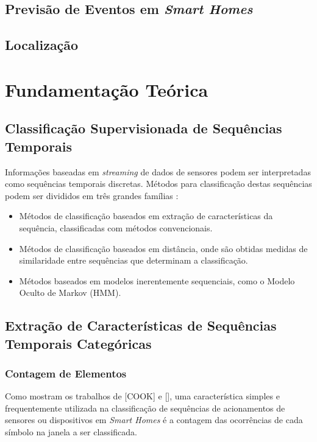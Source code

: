 \documentclass[
	12pt,				%
	openright,			%
	twoside,			%
	a4paper,			%
	english,			%
	spanish,			%
	brazil,				%
	]{abntex2}\usepackage[]{graphicx}\usepackage[]{color}
\begin{document}
\section{Previsão de Eventos em \textit{Smart Homes}}


\section{Localização}


\chapter{Fundamentação Teórica}

\section{Classificação Supervisionada de Sequências Temporais}

Informações baseadas em \textit{streaming} de dados de sensores podem ser interpretadas como sequências temporais discretas. Métodos para classificação destas sequências podem ser divididos em três grandes famílias \cite{Xing2010}:

\begin{itemize}
	\item Métodos de classificação baseados em extração de características da sequência, classificadas com métodos convencionais.
	\item Métodos de classificação baseados em distância, onde são obtidas medidas de similaridade entre sequências que determinam a classificação.
	\item Métodos baseados em modelos inerentemente sequenciais, como o Modelo Oculto de Markov (HMM).
\end{itemize}

\section{Extração de Características de Sequências Temporais Categóricas}

\subsection{Contagem de Elementos}
\label{subcontagem}

Como mostram os trabalhos de [COOK] e [], uma característica simples e frequentemente utilizada na classificação de sequências de acionamentos de sensores ou dispositivos em \textit{Smart Homes} é a contagem das ocorrências de cada símbolo na janela a ser classificada.
\end{document}
